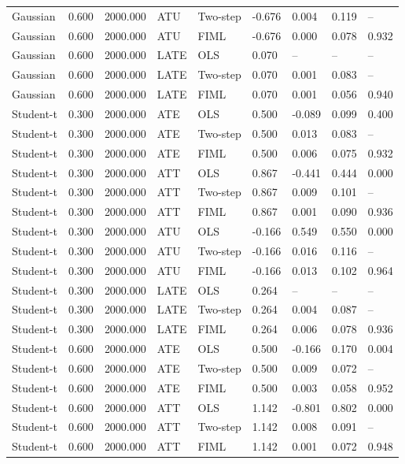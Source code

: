 \begin{table}[htbp]
\begin{tabular}{lllllllll}
Gaussian & 0.600 & 2000.000 & ATU & Two-step & -0.676 & 0.004 & 0.119 & -- \\
Gaussian & 0.600 & 2000.000 & ATU & FIML & -0.676 & 0.000 & 0.078 & 0.932 \\
Gaussian & 0.600 & 2000.000 & LATE & OLS & 0.070 & -- & -- & -- \\
Gaussian & 0.600 & 2000.000 & LATE & Two-step & 0.070 & 0.001 & 0.083 & -- \\
Gaussian & 0.600 & 2000.000 & LATE & FIML & 0.070 & 0.001 & 0.056 & 0.940 \\
Student-t & 0.300 & 2000.000 & ATE & OLS & 0.500 & -0.089 & 0.099 & 0.400 \\
Student-t & 0.300 & 2000.000 & ATE & Two-step & 0.500 & 0.013 & 0.083 & -- \\
Student-t & 0.300 & 2000.000 & ATE & FIML & 0.500 & 0.006 & 0.075 & 0.932 \\
Student-t & 0.300 & 2000.000 & ATT & OLS & 0.867 & -0.441 & 0.444 & 0.000 \\
Student-t & 0.300 & 2000.000 & ATT & Two-step & 0.867 & 0.009 & 0.101 & -- \\
Student-t & 0.300 & 2000.000 & ATT & FIML & 0.867 & 0.001 & 0.090 & 0.936 \\
Student-t & 0.300 & 2000.000 & ATU & OLS & -0.166 & 0.549 & 0.550 & 0.000 \\
Student-t & 0.300 & 2000.000 & ATU & Two-step & -0.166 & 0.016 & 0.116 & -- \\
Student-t & 0.300 & 2000.000 & ATU & FIML & -0.166 & 0.013 & 0.102 & 0.964 \\
Student-t & 0.300 & 2000.000 & LATE & OLS & 0.264 & -- & -- & -- \\
Student-t & 0.300 & 2000.000 & LATE & Two-step & 0.264 & 0.004 & 0.087 & -- \\
Student-t & 0.300 & 2000.000 & LATE & FIML & 0.264 & 0.006 & 0.078 & 0.936 \\
Student-t & 0.600 & 2000.000 & ATE & OLS & 0.500 & -0.166 & 0.170 & 0.004 \\
Student-t & 0.600 & 2000.000 & ATE & Two-step & 0.500 & 0.009 & 0.072 & -- \\
Student-t & 0.600 & 2000.000 & ATE & FIML & 0.500 & 0.003 & 0.058 & 0.952 \\
Student-t & 0.600 & 2000.000 & ATT & OLS & 1.142 & -0.801 & 0.802 & 0.000 \\
Student-t & 0.600 & 2000.000 & ATT & Two-step & 1.142 & 0.008 & 0.091 & -- \\
Student-t & 0.600 & 2000.000 & ATT & FIML & 1.142 & 0.001 & 0.072 & 0.948 \\

\end{tabular}
\end{table}
